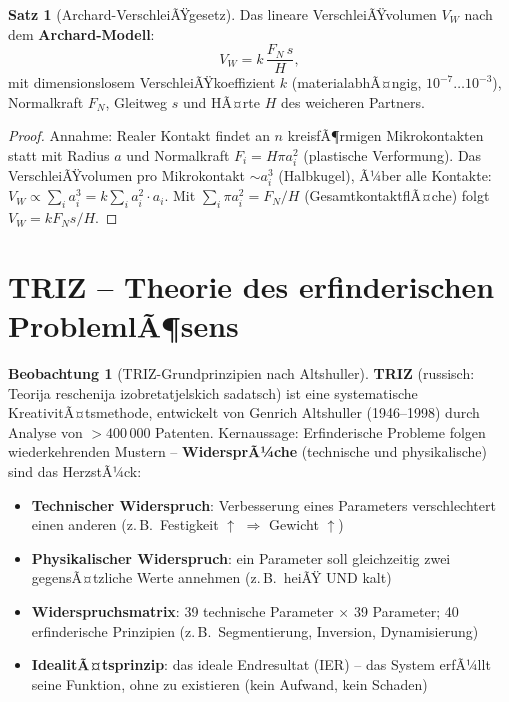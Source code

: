 ﻿\documentclass[a4paper,12pt]{report}
\theoremstyle{definition}
\newtheorem{satz}{Satz}
\newtheorem{beobachtung}{Beobachtung}
\begin{document}
\begin{satz}[Archard-VerschleiÃŸgesetz]
Das lineare VerschleiÃŸvolumen $V_W$ nach dem \textbf{Archard-Modell}:
\[
  V_W = k\,\frac{F_N\,s}{H},
\]
mit dimensionslosem VerschleiÃŸkoeffizient $k$ (materialabhÃ¤ngig,
$10^{-7}\ldots10^{-3}$), Normalkraft $F_N$, Gleitweg $s$ und
HÃ¤rte $H$ des weicheren Partners.
\end{satz}
\begin{proof}
Annahme: Realer Kontakt findet an $n$ kreisfÃ¶rmigen Mikrokontakten
statt mit Radius $a$ und Normalkraft $F_i = H\pi a_i^2$ (plastische Verformung).
Das VerschleiÃŸvolumen pro Mikrokontakt $\sim a_i^3$ (Halbkugel), Ã¼ber alle Kontakte:
$V_W \propto \sum_i a_i^3 = k \sum_i a_i^2 \cdot a_i$.
Mit $\sum_i \pi a_i^2 = F_N/H$ (GesamtkontaktflÃ¤che) folgt $V_W = k F_N s / H$.
\end{proof}


\section{TRIZ -- Theorie des erfinderischen ProblemlÃ¶sens}

\begin{beobachtung}[TRIZ-Grundprinzipien nach Altshuller]
\textbf{TRIZ} (russisch: Teorija reschenija izobretatjelskich sadatsch)
ist eine systematische KreativitÃ¤tsmethode, entwickelt von Genrich Altshuller
(1946--1998) durch Analyse von $> 400\,000$ Patenten.
Kernaussage: Erfinderische Probleme folgen wiederkehrenden Mustern --
\textbf{WidersprÃ¼che} (technische und physikalische) sind das HerzstÃ¼ck:
\begin{itemize}
    \item[-] \textbf{Technischer Widerspruch}: Verbesserung eines Parameters
          verschlechtert einen anderen (z.\,B.\ Festigkeit $\uparrow$ $\Rightarrow$ Gewicht $\uparrow$)
    \item[-] \textbf{Physikalischer Widerspruch}: ein Parameter soll gleichzeitig
          zwei gegensÃ¤tzliche Werte annehmen (z.\,B.\ heiÃŸ UND kalt)
    \item[-] \textbf{Widerspruchsmatrix}: 39 technische Parameter $\times$ 39 Parameter;
          40 erfinderische Prinzipien (z.\,B.\ Segmentierung, Inversion, Dynamisierung)
    \item[-] \textbf{IdealitÃ¤tsprinzip}: das ideale Endresultat (IER) --
          das System erfÃ¼llt seine Funktion, ohne zu existieren (kein Aufwand, kein Schaden)
\end{itemize}
\end{beobachtung}
\end{document}
